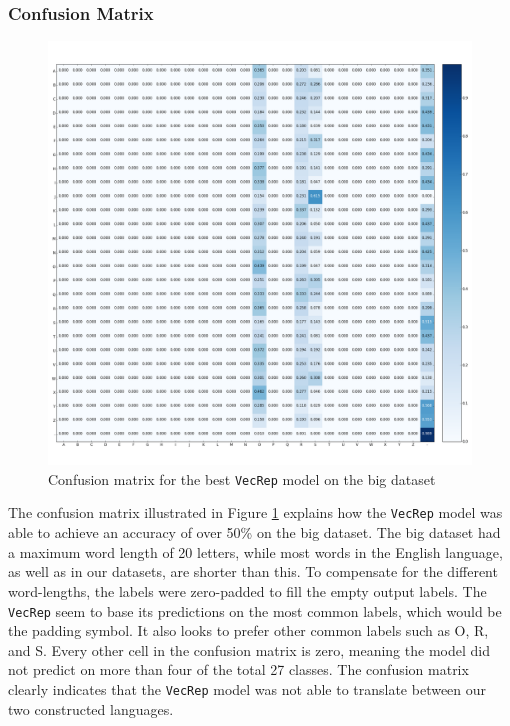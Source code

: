 \subsubsection{Confusion Matrix}
\begin{figure}[h]
    \centering
    \includegraphics[width=1\textwidth]{fig/results/experiment1/big/vecrep/confusion_matrix.png}
    \caption{Confusion matrix for the best {\tt VecRep} model on the big dataset}
    \label{fig:result1_big_vecrep_confusion_matrix}
\end{figure}

The confusion matrix illustrated in Figure \ref{fig:result1_big_vecrep_confusion_matrix} explains how the {\tt VecRep} model was able to achieve an accuracy of over 50\% on the big dataset. The big dataset had a maximum word length of 20 letters, while most words in the English language, as well as in our datasets, are shorter than this. To compensate for the different word-lengths, the labels were zero-padded to fill the empty output labels. The {\tt VecRep} seem to base its predictions on the most common labels, which would be the padding symbol. It also looks to prefer other common labels such as O, R, and S. Every other cell in the confusion matrix is zero, meaning the model did not predict on more than four of the total 27 classes. The confusion matrix clearly indicates that the {\tt VecRep} model was not able to translate between our two constructed languages. 

